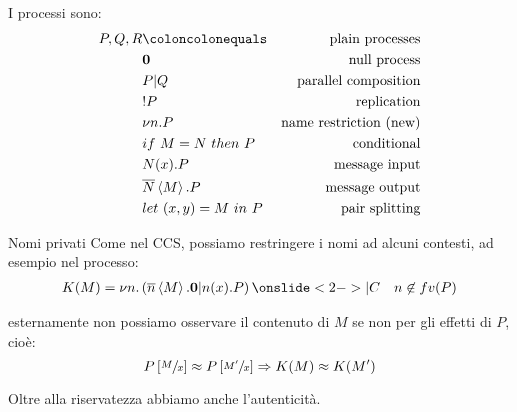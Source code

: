 \begin{frame}
  I processi sono:
  \begin{align*}
    P,Q,R & \coloncolonequals & \text{plain processes} \\
          & \mathbf{0} & \text{null process} \\
          & P | Q & \text{parallel composition} \\
          & !P & \text{replication} \\
          & \nu n.P & \text{name restriction (new)} \\
          & if\ M=N\ then\ P & \text{conditional} \\
          & N(x).P & \text{message input} \\
          & \obar{N}\left< M\right> .P & \text{message output} \\
          & let\ (x,y) = M\ in\ P & \text{pair splitting}
  \end{align*}
\end{frame}

\begin{frame}{Nomi privati}
  Come nel CCS, possiamo restringere i nomi ad alcuni contesti, ad
  esempio nel processo:
  \begin{align*}
  K(M) = \nu n. \pa{ \obar{n}\ang{M}.\mathbf{0} | n(x).P }
    \onslide<2->{ |C }& &  n\not\in
    fv(P)
  \end{align*}

  esternamente non possiamo osservare il contenuto di $M$ se non per
  gli effetti di $P$, cioè:
  \[ P\left[\sfrac{M}{x}\right] \approx P\left[\sfrac{M'}{x}\right] \Rightarrow K(M)
    \approx K(M') \]
  
  Oltre alla riservatezza abbiamo anche l'autenticit\`a.
\end{frame}

